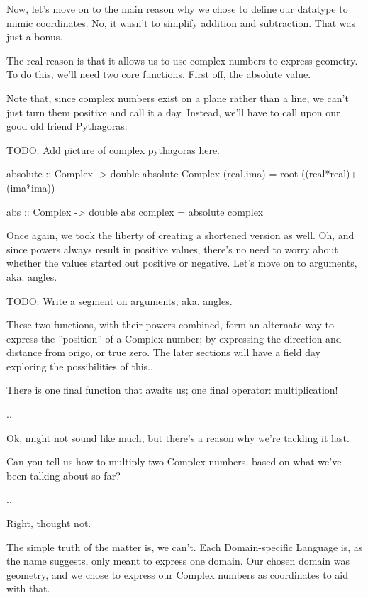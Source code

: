 Now, let's move on to the main reason why we chose to define our datatype to mimic coordinates. No, it wasn't to simplify addition and subtraction. That was just a bonus.

The real reason is that it allows us to use complex numbers to express geometry. To do this, we'll need two core functions. First off, the absolute value.

Note that, since complex numbers exist on a plane rather than a line, we can't just turn them positive and call it a day. Instead, we'll have to call upon our good old friend Pythagoras:

TODO: Add picture of complex pythagoras here.

\begin{code}
absolute :: Complex -> double
absolute Complex (real,ima) = root ((real*real)+(ima*ima))

abs :: Complex -> double
abs complex = absolute complex
\end{code}
Once again, we took the liberty of creating a shortened version as well. Oh, and since powers always result in positive values, there's no need to worry about whether the values started out positive or negative.
Let's move on to arguments, aka. angles.

TODO: Write a segment on arguments, aka. angles.

These two functions, with their powers combined, form an alternate way to express the ''position'' of a Complex number; by expressing the direction and distance from origo, or true zero. The later sections will have a field day exploring the possibilities of this..


There is one final function that awaits us; one final operator: multiplication!

..

Ok, might not sound like much, but there's a reason why we're tackling it last.

Can you tell us how to multiply two Complex numbers, based on what we've been talking about so far?

..

Right, thought not.

The simple truth of the matter is, we can't. Each Domain-specific Language is, as the name suggests, only meant to express one domain. Our chosen domain was geometry, and we chose to express our Complex numbers as coordinates to aid with that.

